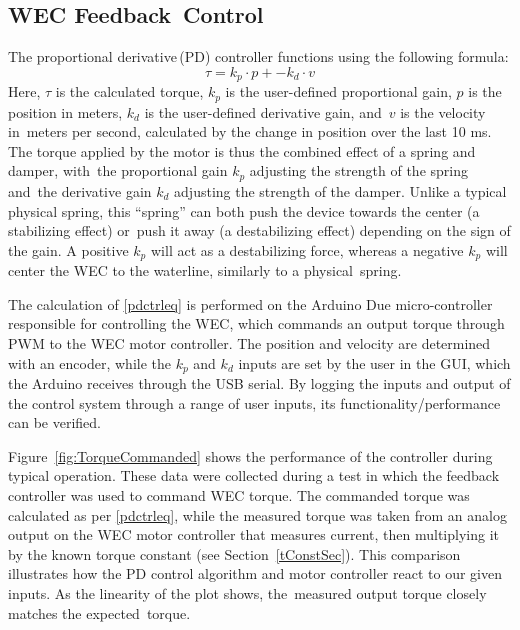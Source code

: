 \documentclass[hardware,article,submit,pdftex,moreauthors]{Definitions/mdpi}
\begin{document}
\subsection{WEC Feedback~Control}
The proportional derivative\,(PD) controller functions using the following formula:
%
\begin{equation}  \label{pdctrleq}
  \tau = k_p \cdot p + -k_d \cdot v
\end{equation}
%
Here, $\tau$ is the calculated torque, $k_p$ is the user-defined proportional gain, $p$ is the position in meters, $k_d$ is the user-defined derivative gain, and~$v$ is the velocity in~meters per second, calculated by the change in position over the last 10 ms.
The torque applied by the motor is thus the combined effect of a spring and damper, with~the proportional gain $k_p$ adjusting the strength of the spring and~the derivative gain $k_d$ adjusting the strength of the damper.
Unlike a typical physical spring, this ``spring'' can both push the device towards the center (a stabilizing effect) or~push it away (a destabilizing effect) depending on the sign of the gain.
A positive $k_p$ will act as a destabilizing force, whereas a negative $k_p$ will center the WEC to the waterline, similarly to a physical~spring.

The calculation of \eqref{pdctrleq} is performed on the Arduino Due micro-controller responsible for controlling the WEC, which commands an output torque through PWM to the WEC motor controller.
The position and velocity are determined with an encoder, while the $k_p$ and $k_d$ inputs are set by the user in the GUI, which the Arduino receives through the USB serial.
By logging the inputs and output of the control system through a range of user inputs, its functionality/performance can be verified.

Figure~\ref{fig:TorqueCommanded} shows the performance of the controller during typical operation.
These data were collected during a test in which the feedback controller was used to command WEC torque.
The commanded torque was calculated as per \eqref{pdctrleq}, while the measured torque was taken from an analog output on the WEC motor controller that measures current, then multiplying it by the known torque constant (see Section~\ref{tConstSec}).
This comparison illustrates how the PD control algorithm and motor controller react to our given inputs.
As the linearity of the plot shows, the~measured output torque closely matches the expected~torque.
\end{document}
